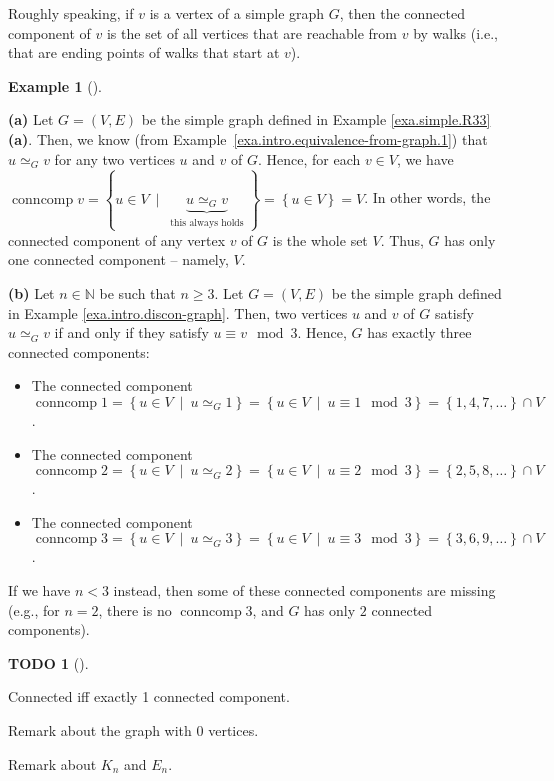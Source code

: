 \documentclass[numbers=enddot,12pt,final,onecolumn,notitlepage]{scrartcl}%
\theoremstyle{definition}
\newtheorem{exam}[theo]{Example}
\newenvironment{example}[1][]
{\begin{exam}[#1]\begin{leftbar}}
{\end{leftbar}\end{exam}}
\newtheorem{quest}[theo]{TODO}
\newenvironment{todo}[1][]
{\begin{quest}[#1]\begin{leftbar}}
{\end{leftbar}\end{quest}}
\newcommand{\conncomp}{\operatorname{conncomp}}
\newcommand{\NN}{\mathbb{N}}
\newcommand{\set}[1]{\left\{ #1 \right\}}
\newcommand{\tup}[1]{\left( #1 \right)}
\newcommand{\underbrack}[2]{\underbrace{#1}_{\substack{#2}}}
\begin{document}
Roughly speaking, if $v$ is a vertex of a simple graph $G$, then
the connected component of $v$ is the set of all vertices that are
reachable from $v$ by walks (i.e., that are ending points of walks
that start at $v$).

\begin{example}
\textbf{(a)} Let $G = \tup{V, E}$ be the simple graph defined in
Example \ref{exa.simple.R33} \textbf{(a)}.
Then, we know (from Example~\ref{exa.intro.equivalence-from-graph.1})
that $u \simeq_G v$ for any two vertices $u$ and $v$ of $G$.
Hence, for each $v \in V$, we have
$\conncomp v
= \set{ u \in V \ \mid \  \underbrack{u \simeq_G v}
                                     {\text{this always holds}} }
= \set{ u \in V } = V$.
In other words, the connected component of any vertex $v$
of $G$ is the whole set $V$.
Thus, $G$ has only one connected component -- namely, $V$.

\textbf{(b)} Let $n \in \NN$ be such that $n \geq 3$.
Let $G = \tup{V, E}$ be the simple graph defined in
Example \ref{exa.intro.discon-graph}.
Then, two vertices $u$ and $v$ of $G$ satisfy
$u \simeq_G v$ if and only if they satisfy
$u \equiv v \mod 3$.
Hence, $G$ has exactly three connected components:
\begin{itemize}
\item The connected component
      $\conncomp 1
       = \set{ u \in V \ \mid \  u \simeq_G 1 }
       = \set{ u \in V \ \mid \  u \equiv 1 \mod 3 }
       = \set{1, 4, 7, \ldots} \cap V$.
\item The connected component
      $\conncomp 2
       = \set{ u \in V \ \mid \  u \simeq_G 2 }
       = \set{ u \in V \ \mid \  u \equiv 2 \mod 3 }
       = \set{2, 5, 8, \ldots} \cap V$.
\item The connected component
      $\conncomp 3
       = \set{ u \in V \ \mid \  u \simeq_G 3 }
       = \set{ u \in V \ \mid \  u \equiv 3 \mod 3 }
       = \set{3, 6, 9, \ldots} \cap V$.
\end{itemize}
If we have $n < 3$ instead, then some of these
connected components are missing (e.g., for $n = 2$,
there is no $\conncomp 3$, and $G$ has only $2$
connected components).
\end{example}

\begin{todo}
Connected iff exactly 1 connected component.

Remark about the graph with $0$ vertices.

Remark about $K_n$ and $E_n$.
\end{todo}
\end{document}
